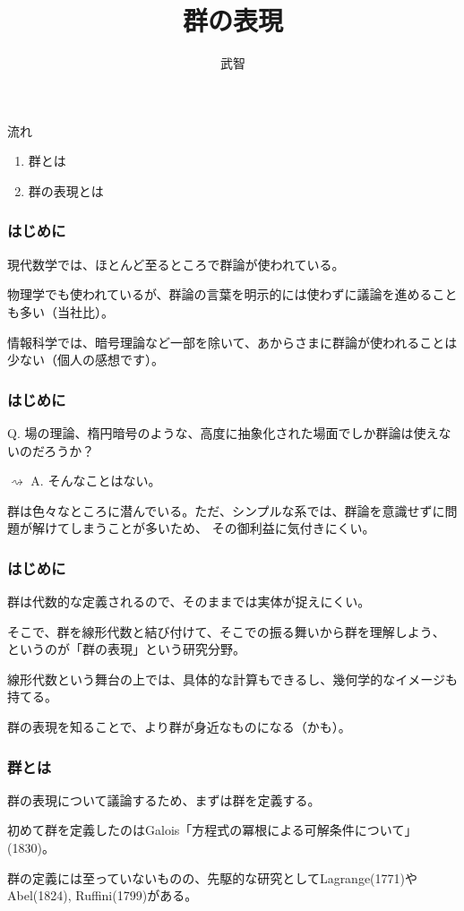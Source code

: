 \documentclass[12pt, t]{beamer}
\title{群の表現}
\author{武智}
\begin{document}
\frame{\maketitle}

\begin{frame}{流れ}
\begin{enumerate}
\item 群とは
\item 群の表現とは
\end{enumerate}
\end{frame}

\begin{frame}
\frametitle{はじめに}
現代数学では、ほとんど至るところで群論が使われている。

物理学でも使われているが、群論の言葉を明示的には使わずに議論を進めることも多い（当社比）。

情報科学では、暗号理論など一部を除いて、あからさまに群論が使われることは少ない（個人の感想です）。
\end{frame}

\begin{frame}
\frametitle{はじめに}
Q. 場の理論、楕円暗号のような、高度に抽象化された場面でしか群論は使えないのだろうか？

$\rightsquigarrow$ A. そんなことはない。

群は色々なところに潜んでいる。ただ、シンプルな系では、群論を意識せずに問題が解けてしまうことが多いため、
その御利益に気付きにくい。
\end{frame}

\begin{frame}
\frametitle{はじめに}
群は代数的な定義されるので、そのままでは実体が捉えにくい。

そこで、群を線形代数と結び付けて、そこでの振る舞いから群を理解しよう、
というのが「群の表現」という研究分野。

線形代数という舞台の上では、具体的な計算もできるし、幾何学的なイメージも持てる。

群の表現を知ることで、より群が身近なものになる（かも）。
\end{frame}

\begin{frame}
\frametitle{群とは}
群の表現について議論するため、まずは群を定義する。

初めて群を定義したのはGalois「方程式の冪根による可解条件について」(1830)。

群の定義には至っていないものの、先駆的な研究としてLagrange(1771)やAbel(1824), Ruffini(1799)がある。
\end{frame}
\end{document}
